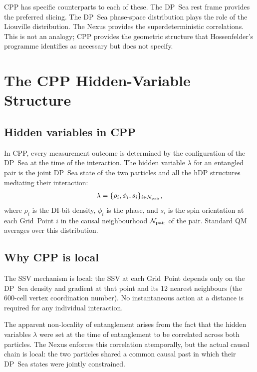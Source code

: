 \documentclass[11pt,letterpaper]{article}
\begin{document}
CPP has specific counterparts to each of these.  The DP~Sea rest
frame provides the preferred slicing.  The DP~Sea phase-space
distribution plays the role of the Liouville distribution.  The
Nexus provides the superdeterministic correlations.  This is not
an analogy; CPP provides the geometric structure that Hossenfelder's
programme identifies as necessary but does not specify.

\section{The CPP Hidden-Variable Structure}

\subsection{Hidden variables in CPP}

In CPP, every measurement outcome is determined by the configuration
of the DP~Sea at the time of the interaction.  The hidden variable
$\lambda$ for an entangled pair is the joint DP~Sea state of the
two particles and all the hDP structures mediating their interaction:
\begin{equation}
\lambda = \{\rho_i, \phi_i, s_i\}_{i \in \mathcal{N}_{\rm pair}},
\label{eq:hv}
\end{equation}
where $\rho_i$ is the DI-bit density, $\phi_i$ is the phase, and
$s_i$ is the spin orientation at each Grid~Point $i$ in the causal
neighbourhood $\mathcal{N}_{\rm pair}$ of the pair.  Standard QM
averages over this distribution.

\subsection{Why CPP is local}

The SSV mechanism is local: the SSV at each Grid~Point depends only
on the DP~Sea density and gradient at that point and its 12 nearest
neighbours (the 600-cell vertex coordination number).  No
instantaneous action at a distance is required for any individual
interaction.

The apparent non-locality of entanglement arises from the fact that
the hidden variables $\lambda$ were set at the time of entanglement
to be correlated across both particles.  The Nexus enforces this
correlation atemporally, but the actual causal chain is local: the
two particles shared a common causal past in which their DP~Sea
states were jointly constrained.
\end{document}
